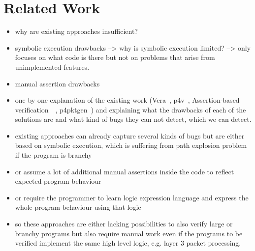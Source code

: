 \section{Related Work}
\begin{itemize}
    \item why are existing approaches insufficient?
    \item symbolic execution drawbacks --> why is symbolic execution limited? --> only focuses on what code is there but not on problems that arise from unimplemented features. 
    \item manual assertion drawbacks
    \item one by one explanation of the existing work (Vera~\cite{Stoenescu:2018:DPP:3230543.3230548}, p4v~\cite{Liu:2018:PPV:3230543.3230582}, Assertion-based verification~\cite{Freire:2018:UBP:3185467.3185499}~\cite{Neves:2018:VPP:3281411.3281421},  p4pktgen~\cite{Notzli:2018:PAT:3185467.3185497}) and explaining what the drawbacks of each of the solutions are and what kind of bugs they can not detect, which we can detect.
    \item existing approaches can already capture several kinds of bugs but are either based on symbolic execution, which is suffering from path explosion problem if the program is branchy
    \item or assume a lot of additional manual assertions inside the code to reflect expected program behaviour
    \item or require the programmer to learn logic expression language and express the whole program behaviour using that logic
    \item so these approaches are either lacking possibilities to also verify large or branchy programs but also require manual work even if the programs to be verified implement the same high level logic, e.g. layer 3 packet processing.
\end{itemize}
